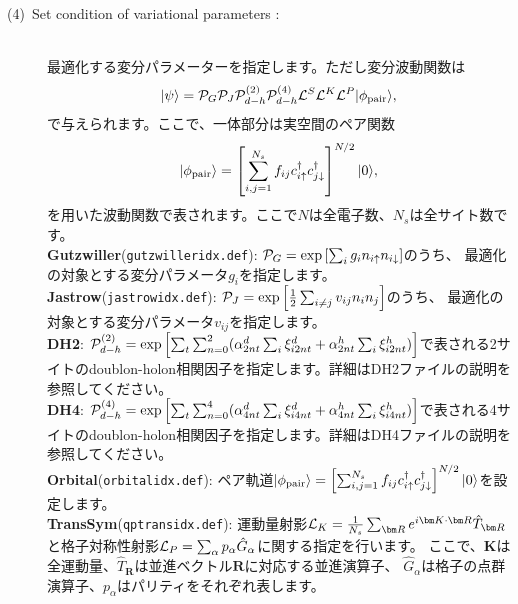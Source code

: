 \begin{description}
\item[(4)~Set condition of variational parameters :] 
~\\最適化する変分パラメーターを指定します。ただし変分波動関数は
\begin{equation}
|\psi \rangle = {\cal P}_G{\cal P}_J{\cal P}_{d-h}^{(2)}{\cal P}_{d-h}^{(4)}{\cal L}^S{\cal L}^K{\cal L}^P |\phi_{\rm pair} \rangle,
\end{equation}
で与えられます。ここで、一体部分は実空間のペア関数
\begin{equation}
|\phi_{\rm pair} \rangle = \left[\sum_{i, j=1}^{N_s} f_{ij}c_{i\uparrow}^{\dag}c_{j\downarrow}^{\dag} \right]^{N/2}|0 \rangle,
\end{equation}
を用いた波動関数で表されます。ここで$N$は全電子数、$N_s$は全サイト数です。
~\\{\bf Gutzwiller}(\verb|gutzwilleridx.def|):
${\cal P}_G=\exp\left[ \sum_i g_i n_{i\uparrow} n_{i\downarrow} \right]$のうち、
最適化の対象とする変分パラメータ$g_i$を指定します。
~\\{\bf Jastrow}(\verb|jastrowidx.def|):
${\cal P}_J=\exp\left[\frac{1}{2} \sum_{i\neq j} v_{ij} n_i n_j\right]$のうち、
最適化の対象とする変分パラメータ$v_{ij}$を指定します。
~\\{\bf DH2}:  ${\cal P}_{d-h}^{(2)}= \exp \left[ \sum_t \sum_{n=0}^2 (\alpha_{2nt}^d \sum_{i}\xi_{i2nt}^d+\alpha_{2nt}^h \sum_{i}\xi_{i2nt}^h)\right]$で表される2サイトのdoublon-holon相関因子を指定します。詳細はDH2ファイルの説明を参照してください。
~\\{\bf DH4}:  ${\cal P}_{d-h}^{(4)}= \exp \left[ \sum_t \sum_{n=0}^4 (\alpha_{4nt}^d \sum_{i}\xi_{i4nt}^d+\alpha_{4nt}^h \sum_{i}\xi_{i4nt}^h)\right]$で表される4サイトのdoublon-holon相関因子を指定します。詳細はDH4ファイルの説明を参照してください。
~\\{\bf Orbital}(\verb|orbitalidx.def|):
ペア軌道$|\phi_{\rm pair} \rangle = \left[\sum_{i, j=1}^{N_s} f_{ij}c_{i\uparrow}^{\dag}c_{j\downarrow}^{\dag} \right]^{N/2}|0 \rangle$を設定します。
~\\{\bf TransSym}(\verb|qptransidx.def|):
運動量射影${\cal L}_K=\frac{1}{N_s}\sum_{{\bm R}}e^{i {\bm K} \cdot{\bm R} } \hat{T}_{\bm R}$
と格子対称性射影${\cal L}_P=\sum_{\alpha}p_{\alpha} \hat{G}_{\alpha}$に関する指定を行います。
ここで、${\bm K}$は全運動量、$\hat{T}_{\bm R}$は並進ベクトル${\bm R}$に対応する並進演算子、
$\hat{G}_{\alpha}$は格子の点群演算子、$p_\alpha$はパリティをそれぞれ表します。


\end{description}
